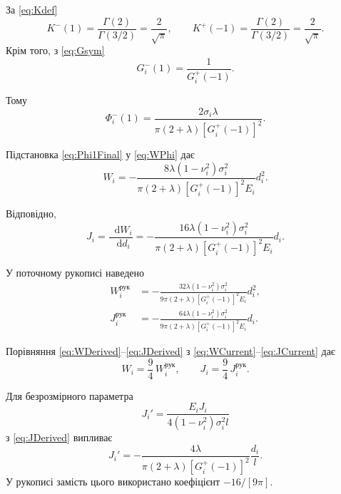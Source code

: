 \documentclass[12pt,a4paper]{article}
\newcommand{\dd}{\mathop{}\!\mathrm{d}}
\begin{document}
За \eqref{eq:Kdef}
\begin{equation}
\label{eq:Km1}
  K^-(1)
  =
  \frac{\Gamma(2)}{\Gamma(3/2)}
  =
  \frac{2}{\sqrt{\pi}},
  \qquad
  K^+(-1)
  =
  \frac{\Gamma(2)}{\Gamma(3/2)}
  =
  \frac{2}{\sqrt{\pi}}.
\end{equation}
Крім того, з \eqref{eq:Gsym}
\begin{equation}
\label{eq:G1}
  G_i^-(1)=\frac{1}{G_i^+(-1)}.
\end{equation}

Тому
\begin{equation}
\label{eq:Phi1Final}
  \Phi_i^-(1)
  =
  \frac{2\sigma_i\lambda}
  {\pi(2+\lambda)[G_i^+(-1)]^2}.
\end{equation}

Підстановка \eqref{eq:Phi1Final} у \eqref{eq:WPhi} дає
\begin{equation}
\boxed{
  W_i=
  -\frac{8\lambda(1-\nu_i^2)\sigma_i^2}
  {\pi(2+\lambda)[G_i^+(-1)]^2E_i}
  d_i^2
  }.
\label{eq:WDerived}
\end{equation}

Відповідно,
\begin{equation}
\boxed{
  J_i=
  \frac{\dd W_i}{\dd d_i}
  =
  -\frac{16\lambda(1-\nu_i^2)\sigma_i^2}
  {\pi(2+\lambda)[G_i^+(-1)]^2E_i}
  d_i
  }.
\label{eq:JDerived}
\end{equation}

У поточному рукописі наведено
\begin{align}
  W_i^{\mathrm{рук}}
  &=
  -\frac{32\lambda(1-\nu_i^2)\sigma_i^2}
  {9\pi(2+\lambda)[G_i^+(-1)]^2E_i}
  d_i^2,
\label{eq:WCurrent}
\\
  J_i^{\mathrm{рук}}
  &=
  -\frac{64\lambda(1-\nu_i^2)\sigma_i^2}
  {9\pi(2+\lambda)[G_i^+(-1)]^2E_i}
  d_i.
\label{eq:JCurrent}
\end{align}

Порівняння \eqref{eq:WDerived}--\eqref{eq:JDerived}
з \eqref{eq:WCurrent}--\eqref{eq:JCurrent} дає
\begin{equation}
\boxed{
  W_i=\frac94\,W_i^{\mathrm{рук}},
  \qquad
  J_i=\frac94\,J_i^{\mathrm{рук}}.
}
\label{eq:factor94}
\end{equation}

Для безрозмірного параметра
\[
  J_i'=
  \frac{E_iJ_i}
       {4(1-\nu_i^2)\sigma_i^2l}
\]
з \eqref{eq:JDerived} випливає
\begin{equation}
\boxed{
  J_i'
  =
  -\frac{4\lambda}
  {\pi(2+\lambda)[G_i^+(-1)]^2}
  \frac{d_i}{l}
  }.
\label{eq:JprimeDerived}
\end{equation}
У рукописі замість цього використано коефіцієнт
$-16/[9\pi]$.
\end{document}
